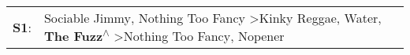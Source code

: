 \begin{supertabular}{p{0.03\textwidth}p{0.92\textwidth}}
 \textbf{S1}:  &  Sociable Jimmy\textsuperscript{}, \enspace Nothing Too Fancy\textsuperscript{} \textgreater \enspace Kinky Reggae\textsuperscript{}, \enspace Water\textsuperscript{}, \enspace \textbf{The Fuzz\textsuperscript{$\wedge$}} \textgreater \enspace Nothing Too Fancy\textsuperscript{}, \enspace Nopener\textsuperscript{}  \enspace  \\
\end{supertabular}
